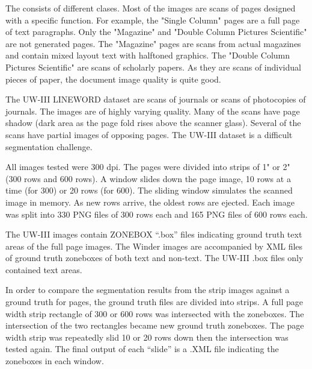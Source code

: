 \documentclass[conference]{IEEEtran}
\begin{document}
The \cite{winder2010extending} consists of different clases. Most of the images
are scans of pages designed with a specific function. For example, the "Single
Column" pages are a full page of text paragraphs. Only the "Magazine" and
"Double Column Pictures Scientific" are not generated pages. The "Magazine"
pages are scans from actual magazines and contain mixed layout text with
halftoned graphics. The "Double Column Pictures Scientific" are scans of
scholarly papers.  As they are scans of individual pieces of paper, the
document image quality is quite good.

The UW-III LINEWORD dataset are scans of journals or scans of photocopies of
journals. The images are of highly varying quality. Many of the scans have page
shadow (dark area as the page fold rises above the scanner glass). Several of
the scans have partial images of opposing pages. The UW-III dataset is a
difficult segmentation challenge.

All images tested were 300 dpi.  The pages were divided into strips of 1" or 2"
(300 rows and 600 rows). A window slides down the page image, 10 rows at a time
(for 300) or 20 rows (for 600).  The sliding window simulates the scanned image
in memory. As new rows arrive, the oldest rows are ejected.  Each 
image was split into 330 PNG files of 300 rows each and 165 PNG files of 600
rows each.  


The UW-III images contain ZONEBOX “.box” files indicating ground truth text
areas of the full page images. The Winder images are accompanied by XML files
of ground truth zoneboxes of both text and non-text. The UW-III .box files only
contained text areas.

In order to compare the segmentation results from the strip images against a
ground truth for pages, the ground truth files are divided into strips.  A full
page width strip rectangle of 300 or 600 rows was intersected with the
zoneboxes. The intersection of the two rectangles became new ground truth
zoneboxes. The page width strip was repeatedly slid 10 or 20 rows down then the
intersection was tested again. The final output of each “slide” is a .XML file
indicating the zoneboxes in each window.
\end{document}
